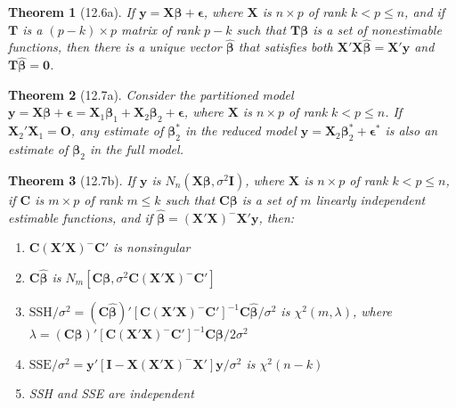 \documentclass{article}
\newtheorem{theorem}{Theorem}[section]
\begin{document}
\begin{theorem}[12.6a]
If $\mathbf{y} = \mathbf{X}\boldsymbol{\beta} + \boldsymbol{\epsilon}$, where $\mathbf{X}$ is $n \times p$ of rank $k < p \leq n$, and if $\mathbf{T}$ is a $(p-k) \times p$ matrix of rank $p-k$ such that $\mathbf{T}\boldsymbol{\beta}$ is a set of nonestimable functions, then there is a unique vector $\hat{\boldsymbol{\beta}}$ that satisfies both $\mathbf{X}'\mathbf{X}\hat{\boldsymbol{\beta}} = \mathbf{X}'\mathbf{y}$ and $\mathbf{T}\hat{\boldsymbol{\beta}} = \mathbf{0}$.
\end{theorem}

\begin{theorem}[12.7a]
Consider the partitioned model $\mathbf{y} = \mathbf{X}\boldsymbol{\beta} + \boldsymbol{\epsilon} = \mathbf{X}_1\boldsymbol{\beta}_1 + \mathbf{X}_2\boldsymbol{\beta}_2 + \boldsymbol{\epsilon}$, where $\mathbf{X}$ is $n \times p$ of rank $k < p \leq n$. If $\mathbf{X}_2'\mathbf{X}_1 = \mathbf{O}$, any estimate of $\boldsymbol{\beta}_2^*$ in the reduced model $\mathbf{y} = \mathbf{X}_2\boldsymbol{\beta}_2^* + \boldsymbol{\epsilon}^*$ is also an estimate of $\boldsymbol{\beta}_2$ in the full model.
\end{theorem}

\begin{theorem}[12.7b]
If $\mathbf{y}$ is $N_n(\mathbf{X}\boldsymbol{\beta}, \sigma^2\mathbf{I})$, where $\mathbf{X}$ is $n \times p$ of rank $k < p \leq n$, if $\mathbf{C}$ is $m \times p$ of rank $m \leq k$ such that $\mathbf{C}\boldsymbol{\beta}$ is a set of $m$ linearly independent estimable functions, and if $\hat{\boldsymbol{\beta}} = (\mathbf{X}'\mathbf{X})^{-}\mathbf{X}'\mathbf{y}$, then:
\begin{enumerate}[label=(\roman*)]
\item $\mathbf{C}(\mathbf{X}'\mathbf{X})^{-}\mathbf{C}'$ is nonsingular
\item $\mathbf{C}\hat{\boldsymbol{\beta}}$ is $N_m[\mathbf{C}\boldsymbol{\beta}, \sigma^2\mathbf{C}(\mathbf{X}'\mathbf{X})^{-}\mathbf{C}']$
\item $\text{SSH}/\sigma^2 = (\mathbf{C}\hat{\boldsymbol{\beta}})'[\mathbf{C}(\mathbf{X}'\mathbf{X})^{-}\mathbf{C}']^{-1}\mathbf{C}\hat{\boldsymbol{\beta}}/\sigma^2$ is $\chi^2(m,\lambda)$, where $\lambda = (\mathbf{C}\boldsymbol{\beta})'[\mathbf{C}(\mathbf{X}'\mathbf{X})^{-}\mathbf{C}']^{-1}\mathbf{C}\boldsymbol{\beta}/2\sigma^2$
\item $\text{SSE}/\sigma^2 = \mathbf{y}'[\mathbf{I} - \mathbf{X}(\mathbf{X}'\mathbf{X})^{-}\mathbf{X}']\mathbf{y}/\sigma^2$ is $\chi^2(n-k)$
\item SSH and SSE are independent
\end{enumerate}
\end{theorem}
\end{document}
